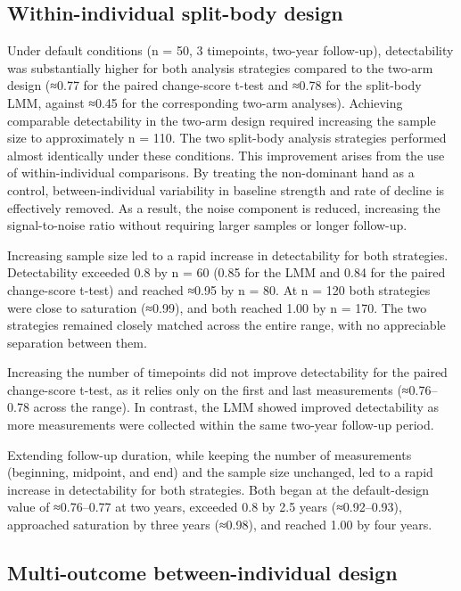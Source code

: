 \documentclass[twocolumn]{article} %
\begin{document}
\subsection{Within-individual split-body design}

Under default conditions (n = 50, 3 timepoints, two-year follow-up), detectability was substantially higher for both analysis strategies compared to the two-arm design (≈0.77 for the paired change-score t-test and ≈0.78 for the split-body LMM, against ≈0.45 for the corresponding two-arm analyses). Achieving comparable detectability in the two-arm design required increasing the sample size to approximately n = 110. The two split-body analysis strategies performed almost identically under these conditions. This improvement arises from the use of within-individual comparisons. By treating the non-dominant hand as a control, between-individual variability in baseline strength and rate of decline is effectively removed. As a result, the noise component is reduced, increasing the signal-to-noise ratio without requiring larger samples or longer follow-up.

Increasing sample size led to a rapid increase in detectability for both strategies. Detectability exceeded 0.8 by n = 60 (0.85 for the LMM and 0.84 for the paired change-score t-test) and reached ≈0.95 by n = 80. At n = 120 both strategies were close to saturation (≈0.99), and both reached 1.00 by n = 170. The two strategies remained closely matched across the entire range, with no appreciable separation between them.

Increasing the number of timepoints did not improve detectability for the paired change-score t-test, as it relies only on the first and last measurements (≈0.76–0.78 across the range). In contrast, the LMM showed improved detectability as more measurements were collected within the same two-year follow-up period.

Extending follow-up duration, while keeping the number of measurements (beginning, midpoint, and end) and the sample size unchanged, led to a rapid increase in detectability for both strategies. Both began at the default-design value of ≈0.76–0.77 at two years, exceeded 0.8 by 2.5 years (≈0.92–0.93), approached saturation by three years (≈0.98), and reached 1.00 by four years.

\subsection{Multi-outcome between-individual design}
\end{document}
